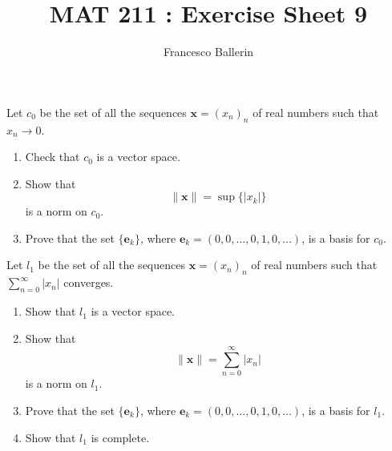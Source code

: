 \documentclass[11pt]{article}%
\title{MAT 211 : Exercise Sheet 9}
\author{Francesco Ballerin}
\date{\color{gray}{\small{francesco.ballerin@uib.no}}}
\begin{document}
\begin{minipage}[t]{\dimexpr \textwidth-6cm-\columnsep}
     \maketitle
\end{minipage}
\hfill\noindent{}

\vspace{50pt}

\begin{Exercise}[title={**$\dagger$}]
	Let $c_0$ be the set of all the sequences $\textbf{x}=(x_n)_n$ of real numbers such that $x_n\to0$.
	\begin{enumerate}
		\item Check that $c_0$ is a vector space.
		\item Show that \[\lVert \textbf{x} \rVert = \sup\{|x_k|\}\] is a norm on $c_0$.
		\item Prove that the set $\{\textbf{e}_k\}$, where $\textbf{e}_k = (0,0,\dots,0,1,0,\dots)$, is a basis for $c_0$.
	\end{enumerate}
\end{Exercise}

\begin{Exercise}[title={**$\dagger$}]
	Let $l_1$ be the set of all the sequences $\textbf{x}=(x_n)_n$ of real numbers such that $\sum_{n=0}^\infty |x_n|$ converges.
	\begin{enumerate}
		\item Show that $l_1$ is a vector space.
		\item Show that \[\lVert \textbf{x} \rVert = \sum_{n=0}^\infty |x_n|\] is a norm on $l_1$.
		\item Prove that the set $\{\textbf{e}_k\}$, where $\textbf{e}_k = (0,0,\dots,0,1,0,\dots)$, is a basis for $l_1$.
		\item Show that $l_1$ is complete.
	\end{enumerate}
\end{Exercise}
\end{document}
